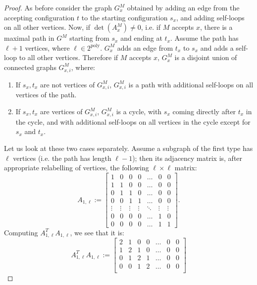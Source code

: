 \documentclass[11pt]{article}
\theoremstyle{definition}
\theoremstyle{remark}
\newcommand{\poly}{\textrm{poly}}
\begin{document}
\begin{proof}
As before consider the graph $G^M_x$ obtained by adding an edge from the accepting configuration $t$ to the starting configuration $s_x$, and adding self-loops on all other vertices. 
Now, if $\det(A^M_x) \neq 0$, i.e. if $M$ accepts $x$, there is a maximal path in $G^M$ starting from $s_x$ and ending at $t_x$. Assume the path has $\ell+1$ vertices, where $\ell \in 2^{\poly}$. $G^M_x$ adds an edge from $t_x$ to $s_x$ and adds a self-loop to all other vertices. Therefore if $M$ accepts $x$, $G^M_x$ is a disjoint union of connected graphs $G^M_{x,i}$, where:
\begin{enumerate}
\item If $s_x, t_x$ are not vertices of $G^M_{x,i}$, $G^M_{x,i}$ is a path with additional self-loops on all vertices of the path.
\item If $s_x, t_x$ are vertices of $G^M_{x,i}$, $G^M_{x,i}$ is a cycle, with $s_x$ coming directly after $t_x$ in the cycle, and with additional self-loops on all vertices in the cycle except for $s_x$ and $t_x$.
\end{enumerate}
Let us look at these two cases separately. Assume a subgraph of the first type has $\ell$ vertices (i.e. the path has length $\ell-1$); then its adjacency matrix is, after appropriate relabelling of vertices, the following $\ell \times \ell$ matrix:
\begin{equation}
A_{1,\ell} := 
\begin{bmatrix}
    1 & 0 & 0 & 0 & \dots  & 0  & 0 \\
    1 & 1 & 0 & 0 &\dots  & 0 & 0 \\
    0 & 1 & 1 & 0 & \dots  & 0 & 0 \\
     0 & 0 & 1 & 1 & \dots  & 0 & 0 \\
    \vdots & \vdots & \vdots & \vdots & \ddots & \vdots & \vdots \\
    0 & 0 & 0 & 0 & \dots  & 1 & 0 \\
    0 & 0 & 0 & 0 & \dots  & 1 & 1
\end{bmatrix}.
\end{equation}
Computing $A_{1,\ell}^T A_{1,\ell}$, we see that it is:
\begin{equation} \label{eq:psd_mat}
A_{1,\ell}^T A_{1,\ell} := 
\begin{bmatrix}
    2 & 1 & 0 & 0 & \dots  & 0  & 0 \\
    1 & 2 & 1 & 0 &\dots  & 0 & 0 \\
    0 & 1 & 2 & 1 & \dots  & 0 & 0 \\
     0 & 0 & 1 & 2 & \dots  & 0 & 0 \\

\end{bmatrix}
\end{equation}
\end{proof}
\end{document}
